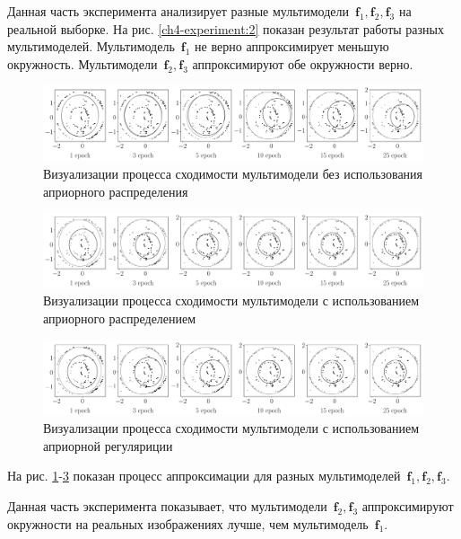 Данная часть эксперимента анализирует разные мультимодели~$\textbf{f}_1, \textbf{f}_2, \textbf{f}_3$ на реальной выборке.
На рис. \ref{ch4-experiment:2} показан результат работы разных мультимоделей.
Мультимодель~$\textbf{f}_1$  не верно аппроксимирует меньшую окружность.
Мультимодели~$\textbf{f}_2, \textbf{f}_3$ аппроксимируют обе окружности верно.

\begin{figure}[!ht]\center
\includegraphics[width=1\textwidth]{results/priorexpert/experiment_real_not_prior}
\caption{Визуализации процесса сходимости мультимодели без использования априорного распределения}
\label{ch4-experiment:3}
\end{figure}

\begin{figure}[!ht]\center
\includegraphics[width=1\textwidth]{results/priorexpert/experiment_real_prior}
\caption{Визуализации процесса сходимости мультимодели с использованием априорного распределением}
\label{ch4-experiment:4}
\end{figure}

\begin{figure}[!ht]\center
\includegraphics[width=1\textwidth]{results/priorexpert/experiment_real_regular}
\caption{Визуализации процесса сходимости мультимодели с использованием априорной регуляриции}
\label{ch4-experiment:5}
\end{figure}

На рис. \ref{ch4-experiment:3}-\ref{ch4-experiment:5} показан процесс аппроксимации для разных мультимоделей~$\textbf{f}_1, \textbf{f}_2, \textbf{f}_3$.

Данная часть эксперимента показывает, что мультимодели~$\textbf{f}_2, \textbf{f}_3$ аппроксимируют окружности на реальных изображениях лучше, чем мультимодель~$\textbf{f}_1$.

